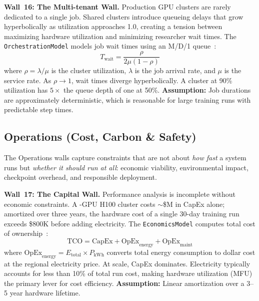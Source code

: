\documentclass[10pt,twocolumn]{article}
\newcommand{\cval}[1]{\pgfmathprintnumber[fixed, precision=1, 1000 sep={\,}]{#1}}
\newcommand{\cvalint}[1]{\pgfmathprintnumber[fixed, precision=0, 1000 sep={\,}]{#1}}
\begin{document}
\textbf{Wall~16: The Multi-tenant Wall.} Production GPU clusters are rarely dedicated to a single job. Shared clusters introduce queueing delays that grow hyperbolically as utilization approaches 1.0, creating a tension between maximizing hardware utilization and minimizing researcher wait times. The \texttt{OrchestrationModel} models job wait times using an M/D/1 queue~\citep{little1961}:
\begin{equation}
\label{eq:queue}
T_{\text{wait}} = \frac{\rho}{2\mu(1 - \rho)}
\end{equation}
where $\rho = \lambda / \mu$ is the cluster utilization, $\lambda$ is the job arrival rate, and $\mu$ is the service rate. As $\rho \to 1$, wait times diverge hyperbolically. A cluster at 90\% utilization has $5{\times}$ the queue depth of one at 50\%. \textbf{Assumption:} Job durations are approximately deterministic, which is reasonable for large training runs with predictable step times.

\subsection{Operations (Cost, Carbon \& Safety)}
\label{sec:walls-operations}

The Operations walls capture constraints that are not about \emph{how fast} a system runs but \emph{whether it should run at all}: economic viability, environmental impact, checkpoint overhead, and responsible deployment.

\textbf{Wall~17: The Capital Wall.} Performance analysis is incomplete without economic constraints. A \cvalint{\ClusterGPUs}-GPU H100 cluster costs ${\sim}$\$\cval{\ClusterCapExM}M in CapEx alone; amortized over three years, the hardware cost of a single 30-day training run exceeds \$800K before adding electricity. The \texttt{EconomicsModel} computes total cost of ownership~\citep{barroso2019}:
\begin{equation}
\label{eq:tco}
\text{TCO} = \text{CapEx} + \text{OpEx}_{\text{energy}} + \text{OpEx}_{\text{maint}}
\end{equation}
where $\text{OpEx}_{\text{energy}} = E_{\text{total}} \times P_{\text{kWh}}$ converts total energy consumption to dollar cost at the regional electricity price. At scale, CapEx dominates. Electricity typically accounts for less than 10\% of total run cost, making hardware utilization (MFU) the primary lever for cost efficiency. \textbf{Assumption:} Linear amortization over a 3--5 year hardware lifetime.
\end{document}

